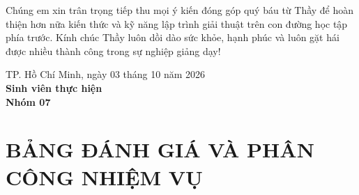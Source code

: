 \documentclass[14pt,a4paper]{extarticle}
\begin{document}
Chúng em xin trân trọng tiếp thu mọi ý kiến đóng góp quý báu từ Thầy để hoàn thiện hơn nữa kiến thức và kỹ năng lập trình giải thuật trên con đường học tập phía trước. Kính chúc Thầy luôn dồi dào sức khỏe, hạnh phúc và luôn gặt hái được nhiều thành công trong sự nghiệp giảng dạy!

\vspace{1.0cm}
\begin{flushright}
    TP. Hồ Chí Minh, ngày 03 tháng 10 năm 2026\\[0.2cm]
    \textbf{Sinh viên thực hiện}\\[0.2cm]
    \textbf{Nhóm 07}
\end{flushright}

\newpage
\thispagestyle{empty}
\begingroup
\titlespacing*{\section}{0pt}{0pt}{4pt}
\section*{BẢNG ĐÁNH GIÁ VÀ PHÂN CÔNG NHIỆM VỤ}
\end{document}
